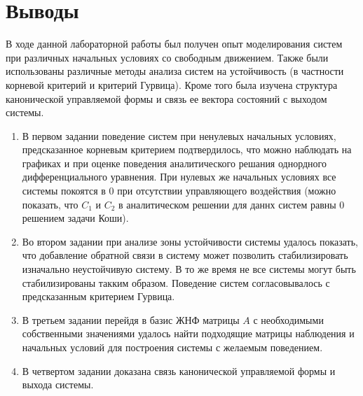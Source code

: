 \section{Выводы}
В ходе данной лабораторной работы был получен опыт моделирования систем при различных начальных
условиях со свободным движением. Также были использованы различные методы анализа систем на устойчивость 
(в частности корневой критерий и критерий Гурвица). Кроме того была изучена структура канонической
управляемой формы и связь ее вектора состояний с выходом системы.
\begin{enumerate}
    \item В первом задании поведение систем при ненулевых начальных условиях, предсказанное корневым критерием подтвердилось, что можно наблюдать
    на графиках и при оценке поведения аналитического решания однордного дифференциального уравнения. При
    нулевых же начальных условиях все системы покоятся в 0 при отсутствии управляющего воздействия 
    (можно показать, что $C_1$ и $C_2$ в аналитическом решении для даннх систем равны 0 решением задачи Коши).
    \item Во втором задании при анализе зоны устойчивости системы удалось показать, что добавление обратной связи
    в систему может позволить стабилизировать изначально неустойчивую систему. В то же время не все системы могут быть
    стабилизированы такким образом. Поведение систем согласовывалось с предсказанным критерием Гурвица.
    \item В третьем задании перейдя в базис ЖНФ матрицы $A$ с необходимыми собственными значениями удалось найти 
    подходящие матрицы наблюдения и начальных условий для построения системы с желаемым поведением.
    \item В четвертом задании доказана связь канонической управляемой формы и выхода системы.
\end{enumerate}
\pagebreak